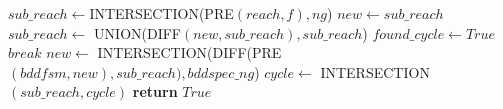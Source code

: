 \documentclass{article}
\begin{document}
\begin{algorithmic}
           \State $sub\_reach\leftarrow $INTERSECTION(PRE$(reach, f),ng$)
           \State $new \leftarrow sub\_reach$
                  \State $sub\_reach\leftarrow$ UNION(DIFF$(new, sub\_reach),sub\_reach$)
                    \State  $found\_cycle\leftarrow True$
                    \State $break$
                  \EndIf  
           \State $new \leftarrow$ INTERSECTION(DIFF(PRE$(bddfsm,new),sub\_reach),bddspec\_ng$)
            \EndWhile
            \State $cycle\leftarrow$ INTERSECTION$(sub\_reach,cycle)$
     \EndWhile
        \State \textbf{return }$ True$
        \EndIf
\EndIf
\EndFunction
\\




\end{algorithmic}
\end{document}
